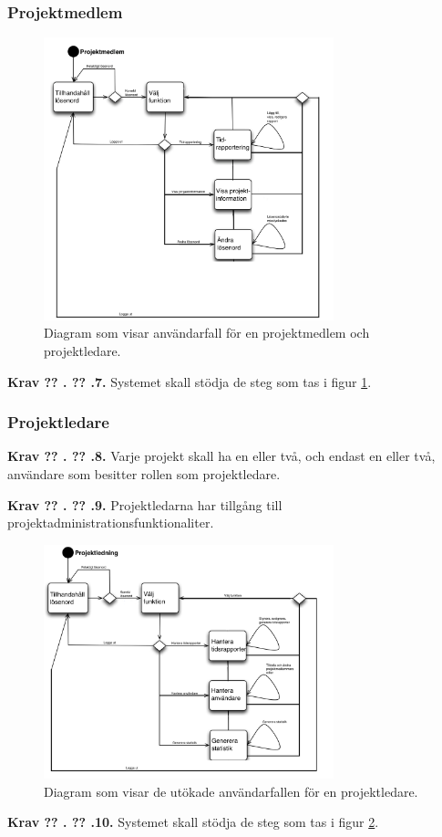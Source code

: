 \documentclass[a4paper]{article}
\newcommand\getcurrentref[1]{%
 \ifnumequal{\value{#1}}{0}
  {??}
  {\the\value{#1}}%
}
\newcommand\requirement[2]{
	\numberedrow{Krav}{#1}{#2}
}
\newcommand\numberedrow[3]{
	\noindent
	\textbf{#1 \getcurrentref{section}.\getcurrentref{subsection}.#2.} #3
	
}
\begin{document}
		\subsubsection*{Projektmedlem}		
			\begin{figure}[H]
				\centering
				\includegraphics[width=0.75\textwidth]{flow_common_proj_mem}
				\caption{Diagram som visar användarfall för en projektmedlem och projektledare.}
				\label{image_gen_promed}
			\end{figure}
		\requirement{7}{Systemet skall stödja de steg som tas i figur \ref{image_gen_promed}.}
		\subsubsection*{Projektledare}
		\requirement{8}{Varje projekt skall ha en eller två, och endast en eller två, användare som besitter rollen som projektledare.}
		\requirement{9}{Projektledarna har tillgång till projektadministrationsfunktionaliter.}
			\begin{figure}[H]
				\centering
				\includegraphics[width=0.75\textwidth]{flow_common_proj_leader}
				\caption{Diagram som visar de utökade användarfallen för en projektledare.}
				\label{image_gen_proboss}
			\end{figure}
		\requirement{10}{Systemet skall stödja de steg som tas i figur \ref{image_gen_proboss}.}
\end{document}
